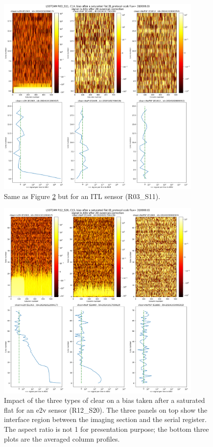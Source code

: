 \begin{figure}[ht]
\begin{centering}
\includegraphics[width=0.9\textwidth]{figures/plots_R03_S11_C14_E1812_bias_2024102800352.png}
\end{centering}
\caption{Same as Figure \ref{fig:clear_e2v} but for an ITL sensor (R03\_S11).}
\label{fig:clear_ITL}
\end{figure}

\begin{figure}[ht]
\begin{centering}
\includegraphics[width=0.9\textwidth]{figures/plots_R12_S20_C15_E1880_bias_2024103000303.png}
\end{centering}
\caption{Impact of the three types of clear on a bias
taken after a saturated flat for an e2v sensor (R12\_S20).
The three panels on top show the interface region between the imaging section and the serial register. The aspect ratio is not 1 for presentation purpose; the bottom three plots are the averaged column profiles.}
\label{fig:clear_e2v}
\end{figure}


